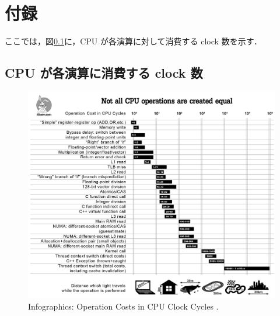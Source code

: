 \chapter*{付録} %

ここでは，図\ref{fig_part101_infographics}に，CPU が各演算に対して消費する clock 数を示す．

\setcounter{section}{0} %
\renewcommand{\thesection}{\Alph{section}} %
\setcounter{equation}{0} %
\renewcommand{\theequation}{\Alph{section}.\arabic{equation}}
\setcounter{figure}{0} %
\renewcommand{\thefigure}{\Alph{section}.\arabic{figure}}
\setcounter{table}{0} %
\renewcommand{\thetable}{\Alph{section}.\arabic{table}}

\section{CPU が各演算に消費する clock 数}
\begin{figure}[h] %
  \centering
  \includegraphics[width=17.25cm]{./fig/part101_infographics_v08.png}
  \caption{
    Infographics: Operation Costs in CPU Clock Cycles \citep{NoBugsHare2016}.
  }
  \label{fig_part101_infographics}
\end{figure}



